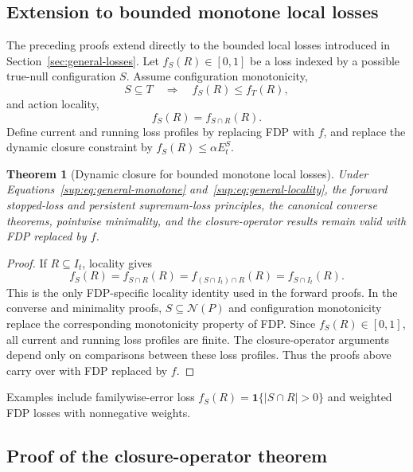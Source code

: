 \documentclass[11pt]{article}
\numberwithin{equation}{section}
\theoremstyle{plain}
\newtheorem{theorem}{Theorem}[section]
\theoremstyle{definition}
\newcommand{\one}{\mathbf 1}
\begin{document}
\subsection{Extension to bounded monotone local losses}\label{sup:losses}

The preceding proofs extend directly to the bounded local losses introduced in Section~\ref{sec:general-losses}. Let $f_S(R)\in[0,1]$ be a loss indexed by a possible true-null configuration $S$. Assume configuration monotonicity,
\begin{equation}\label{sup:eq:general-monotone}
  S\subseteq T\quad\Longrightarrow\quad f_S(R)\leq f_T(R),
\end{equation}
and action locality,
\begin{equation}\label{sup:eq:general-locality}
  f_S(R)=f_{S\cap R}(R).
\end{equation}
Define current and running loss profiles by replacing FDP with $f$, and replace the dynamic closure constraint by $f_S(R)\leq\alpha E_t^S$.

\begin{theorem}[Dynamic closure for bounded monotone local losses]\label{sup:thm:general-loss}
Under Equations~\eqref{sup:eq:general-monotone} and~\eqref{sup:eq:general-locality}, the forward stopped-loss and persistent supremum-loss principles, the canonical converse theorems, pointwise minimality, and the closure-operator results remain valid with FDP replaced by $f$.
\end{theorem}

\begin{proof}
If $R\subseteq I_t$, locality gives
\[
  f_S(R)=f_{S\cap R}(R)=f_{(S\cap I_t)\cap R}(R)=f_{S\cap I_t}(R).
\]
This is the only FDP-specific locality identity used in the forward proofs. In the converse and minimality proofs, $S\subseteq\mathcal N(P)$ and configuration monotonicity replace the corresponding monotonicity property of FDP. Since $f_S(R)\in[0,1]$, all current and running loss profiles are finite. The closure-operator arguments depend only on comparisons between these loss profiles. Thus the proofs above carry over with FDP replaced by $f$.
\end{proof}

Examples include familywise-error loss $f_S(R)=\one\{|S\cap R|>0\}$ and weighted FDP losses with nonnegative weights.

\subsection{Proof of the closure-operator theorem}\label{sup:closure-proof}
\end{document}
